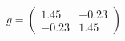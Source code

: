 \documentclass[preview]{standalone}
\begin{document}
\begin{align*}
g = \begin{pmatrix} 1.45 & -0.23 \\ -0.23 & 1.45 \end{pmatrix}
\end{align*}
\end{document}
